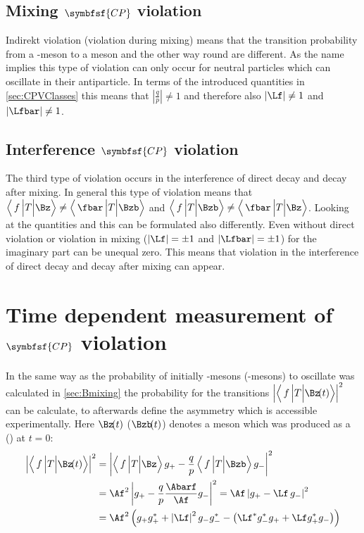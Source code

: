 \subsection[head={Mixing \CP violation},tocentry={Mixing \CP violation}]{Mixing $\symbfsf{C{}P}$ violation}
\label{sec:MixingCPV}

Indirekt \CP violation (\CP violation during mixing) means that the transition probability from a \Bz-meson to a \Bzb meson
and the other way round are different. As the name implies this type of \CP violation can only occur for neutral particles
which can oscillate in their antiparticle. In terms of the introduced quantities in \cref{sec:CPVClasses} this means that
$\left|\frac{q}{p}\right|\neq1$ and therefore also $\left|\Lf\right|\neq1$ and $\left|\Lfbar\right|\neq1$.

\subsection[head={Interference \CP violation},tocentry={Interference \CP violation}]{Interference $\symbfsf{C{}P}$ violation}
\label{sec:InterferenceCPV}

The third type of \CP violation occurs in the interference of direct decay and decay after mixing. In general this type of \CP
violation means that $\left<\,f\,\Big|T\Big|\Bz\right>\neq\left<\,\fbar\,\Big|T\Big|\Bzb\right>$ and
$\left<\,f\,\Big|T\Big|\Bzb\right>\neq\left<\,\fbar\,\Big|T\Big|\Bz\right>$. Looking at the quantities \Lf and \Lfbar this can
be formulated also differently. Even without direct \CP violation or \CP violation in mixing ($\left|\Lf\right|=\pm1$ and
$\left|\Lfbar\right|=\pm1$) for the imaginary part can be unequal zero. This means that \CP violation in the interference of
direct decay and decay after mixing can appear.

\section[head={Time dependent measurement of \CP violation},tocentry={Time dependent measurement of \CP violation}]
{Time dependent measurement of $\symbfsf{C{}P}$ violation}
\label{sec:TimeDependentCPV}

In the same way as the probability of initially \B-mesons (\Bzb-mesons) to oscillate was calculated in \cref{sec:Bmixing} the
probability for the transitions $\left|\left<\,f\,\Big|T\Big|\Bz\!(t)\right>\right|^2$ can be calculate, to afterwards define the
\CP asymmetry which is accessible experimentally. Here $\Bz\!(t)$ ($\Bzb\!(t)$) denotes a \B meson which was produced as a \Bz
(\Bzb) at $t=0$:
\begin{align}
\left|\left<\,f\,\Big|T\Big|\Bz\!(t)\right>\right|^2 &= \left|\left<\,f\,\Big|T\Big|\Bz\right>g_+-\frac{q}{p}\left<\,f\,\Big|T\Big|\Bzb\right>g_-\right|^2\\
&=\Af^2\left|g_+ - \frac{q}{p}\frac{\Abarf}{\Af} g_-\right|^2=\Af\left|g_+ -\Lf\,g_-\right|^2\\
&=\Af^2\left(g_+g_+^*+\left|\Lf\right|^2g_-g_-^*-\left(\Lf^*g_-^*g_+ + \Lf g_+^* g_-\right)\right)
\end{align}
